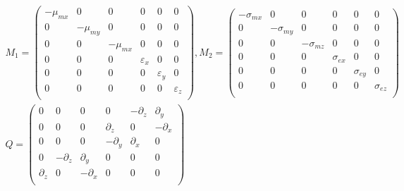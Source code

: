 \documentclass[pdftex,a4paper,parskip,listof=totoc,bibliography=totoc,onehalfspacing,12pt]{scrreprt}
\begin{document}
\begin{equation}
\begin{aligned}
\begin{split}
& M_1 =
 \begin{pmatrix}
   -\mu_{mx}       & 0         & 0         & 0         & 0         & 0       \\
   0          & -\mu_{my}      & 0         & 0         & 0         & 0        \\
   0          & 0         & -\mu_{mx}      & 0         & 0         & 0        \\
   0          & 0         & 0         & \varepsilon_{x}      & 0         & 0        \\
   0          & 0         & 0         & 0         & \varepsilon_{y}      & 0        \\
   0          & 0         & 0         & 0         & 0         & \varepsilon_{z}     \\
 \end{pmatrix}, 
 M_2 =
 \begin{pmatrix}
   -\sigma_{mx}       & 0         & 0         & 0         & 0         & 0       \\
   0          & -\sigma_{my}      & 0         & 0         & 0         & 0        \\
   0          & 0         & -\sigma_{mz}      & 0         & 0         & 0        \\
   0          & 0         & 0         & \sigma_{ex}      & 0         & 0        \\
   0          & 0         & 0         & 0         & \sigma_{ey}      & 0        \\
   0          & 0         & 0         & 0         & 0         & \sigma_{ez}     \\
 \end{pmatrix} \\
& Q = 
 \begin{pmatrix}
   0          & 0         & 0         & 0 	  	& -\partial_{z}	& \partial_{y}   \\
   0          & 0         & 0         & \partial_{z} 	& 0 	      	& -\partial_{x}  \\
   0          & 0         & 0         & -\partial_{y}	& \partial_{x} 	& 0	      \\
   0 	  	& -\partial_{z}	& \partial_{y}        & 0         & 0         & 0        \\
   \partial_{z} 	& 0 	      	& -\partial_{x}       & 0 	       & 0         & 0        \\

\end{pmatrix}
\end{split}
\end{aligned}
\end{equation}
\end{document}
